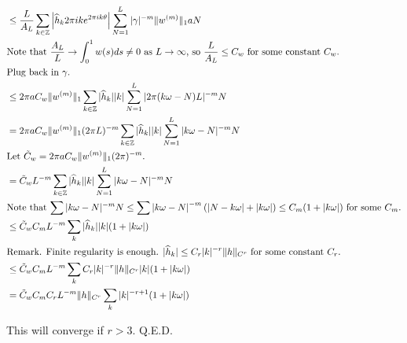 \documentclass[12pt]{article}
\newcommand{\Z}{\mathbb{Z}}
\newcommand{\hk}{\widehat{h}_k}
\begin{document}
\begin{equation*}
\begin{split}
     &\leq \frac{L}{A_L} \sum_{k\in\Z} \left| \hk 2\pi i k e^{2\pi i k \theta} \right| \sum_{N=1}^L|\gamma|^{-m}\|w^{(m)}\|_1 aN\\
     &\text{Note that $\frac{A_L}{L} \rightarrow \int_0^1 w(s)ds \neq 0$ as $L\rightarrow\infty$, so $\frac{L}{A_L} \leq C_w$ for some constant $C_w$. }\\
     &\text{Plug back in $\gamma$.}\\
     &\leq 2\pi a C_w \|w^{(m)}\|_1 \sum_{k\in\Z} |\hk||k| \sum_{N=1}^L|2\pi(k\omega-N)L|^{-m} N\\
     &=2\pi a C_w \|w^{(m)}\|_1 (2\pi L)^{-m} \sum_{k\in\Z} |\hk||k| \sum_{N=1}^L|k\omega-N|^{-m} N\\
     &\text{Let $\Tilde{C}_w = 2\pi a C_w \|w^{(m)}\|_1 (2\pi)^{-m}$. }\\
     &=\Tilde{C}_w L^{-m} \sum_{k\in\Z} |\hk||k| \sum_{N=1}^L|k\omega-N|^{-m} N\\
     &\text{Note that $\sum|k\omega-N|^{-m}N\leq\sum\left|k\omega-N\right|^{-m}\left(|N-k\omega|+|k\omega|\right) 
     \leq C_m(1+|k\omega|)$ for some $C_m$.}\\
     &\leq\Tilde{C}_wC_m L^{-m} \sum_k |\hk||k|(1+|k\omega|)\\
     &\text{Remark. Finite regularity is enough. $|\hk|\leq C_r |k|^{-r}\|h\|_{C^r}$ for some constant $C_r$.}\\
     &\leq \Tilde{C}_wC_m L^{-m} \sum_k C_r|k|^{-r}\|h\|_{C^r}|k|(1+|k\omega|)\\
     &=\Tilde{C}_wC_m C_r L^{-m} \|h\|_{C^r} \sum_k |k|^{-r+1}(1+|k\omega|)
\end{split}\end{equation*}

This will converge if $r>3$. Q.E.D.
\end{document}
